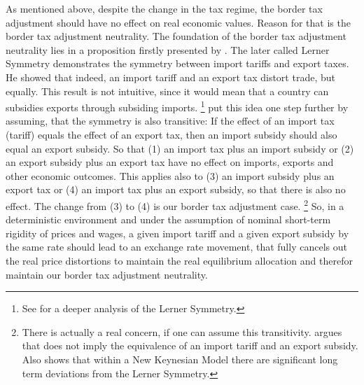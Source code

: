 As mentioned above, despite the change in the tax regime, the border tax adjustment should have no effect on real economic values. Reason for that is the border tax adjustment neutrality.
The foundation of the border tax adjustment neutrality lies in a proposition firstly presented by \cite{lerner1936symmetry}. The later called Lerner Symmetry demonstrates the symmetry between import tariffs and export taxes. He showed that indeed, an import tariff and an export tax distort trade, but equally. This result is not intuitive, since it would mean that a country can subsidies exports through subsiding imports. \footnote{See \cite{bhagwati1998lectures} for a deeper analysis of the Lerner Symmetry.}   \cite{grossman1980border} put this idea one step further by assuming, that the symmetry is also transitive: If the effect of an import tax (tariff) equals the effect of an export tax, then an import subsidy should also equal an export subsidy. So that (1) an import tax plus an import subsidy or (2) an export subsidy plus an export tax have no effect on imports, exports and other economic outcomes. This applies also to (3) an import subsidy plus an export tax or (4) an import tax plus an export subsidy, so that there is also no effect. The change from (3) to (4) is our border tax adjustment case.  \footnote{There is actually a real concern, if one can assume this transitivity. \cite{casas1991lerner} argues that \cite{lerner1936symmetry} does not imply the equivalence of an import tariff and an export subsidy. Also \cite{linde2017macroeconomic} shows that within a New Keynesian Model there are significant long term deviations from the Lerner Symmetry.}
So, in a deterministic environment and under the assumption of nominal short-term rigidity of prices and wages, a given import tariff and a given export subsidy by the same rate should lead to an exchange rate movement, that fully cancels out the real price distortions to maintain the real equilibrium allocation and therefor maintain our border tax adjustment neutrality. \\
